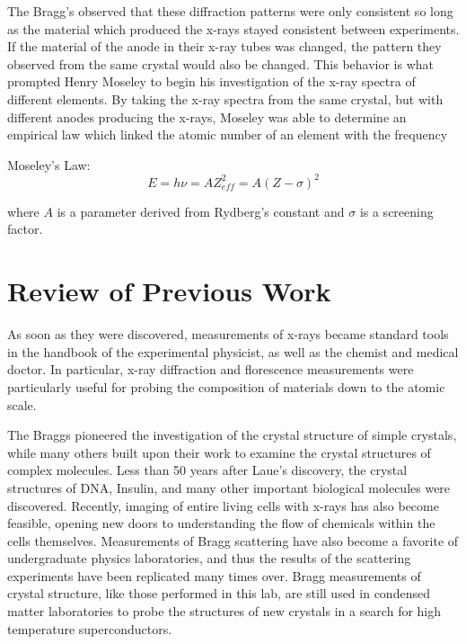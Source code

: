 \documentclass[%
 reprint,
 amsmath,amssymb,
 aps,
 pra,
]{revtex4-1}
\begin{document}
The Bragg's observed that these diffraction patterns were only consistent so long as the material which produced the x-rays stayed consistent between experiments. If the material of the anode in their x-ray tubes was changed, the pattern they observed from the same crystal would also be changed. This behavior is what prompted Henry Moseley to begin his investigation of the x-ray spectra of different elements. By taking the x-ray spectra from the same crystal, but with different anodes producing the x-rays, Moseley was able to determine an empirical law which linked the atomic number of an element with the frequency

Moseley's Law:
\begin{equation}\label{Eq:MLaw}
E = h\nu = A Z_{eff}^{2} = A (Z - \sigma)^2
\end{equation}

where $A$ is a parameter derived from Rydberg's constant and $\sigma$ is a screening factor.

\section{Review of Previous Work}

As soon as they were discovered, measurements of x-rays became standard tools in the handbook of the experimental physicist, as well as the chemist and medical doctor. In particular, x-ray diffraction and florescence measurements were particularly useful for probing the composition of materials down to the atomic scale. 

The Braggs pioneered the investigation of the crystal structure of simple crystals\cite{bragg, xray_history}, while many others built upon their work to examine the crystal structures of complex molecules. Less than 50 years after Laue's discovery, the crystal structures of DNA\cite{dna1, dna2}, Insulin\cite{insulin}, and many other important biological molecules were discovered\cite{scatter_medicine_1, scatter_medicine_2}. Recently, imaging of entire living cells with x-rays has also become feasible, opening new doors to understanding the flow of chemicals within the cells themselves\cite{whole_cells}. Measurements of Bragg scattering have also become a favorite of undergraduate physics laboratories, and thus the results of the scattering experiments have been replicated many times over\cite{scatter_lab_1, scatter_lab_2, jensen}. Bragg measurements of crystal structure, like those performed in this lab, are still used in condensed matter laboratories to probe the structures of new crystals in a search for high temperature superconductors\cite{aronson}.
\end{document}
